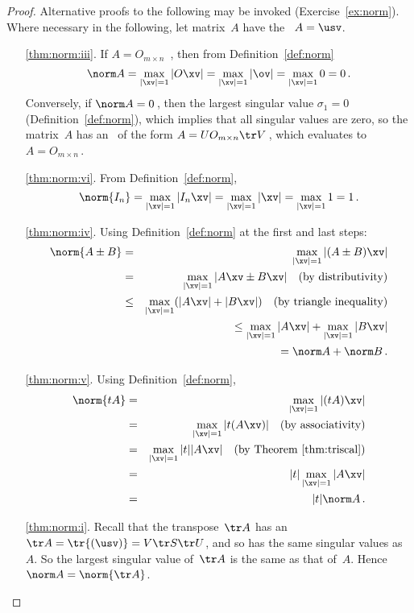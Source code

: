 \begin{proof}  Alternative proofs to the following may be invoked (Exercise~\ref{ex:norm}).
Where necessary in the following, let matrix~\(A\) have the \svd\ \(A=\usv\).
\begin{itemize}
\item[\ref{thm:norm:iii}.]
If \(A=O_{m\times n}\) \,,
then from Definition~\ref{def:norm} 
\begin{equation*}
\norm A=\max_{|\xv|=1}|O\xv|
=\max_{|\xv|=1}|\ov|=\max_{|\xv|=1}0=0\,.
\end{equation*}
Conversely, if \(\norm A=0\)\,, then the largest singular value \(\sigma_1=0\) (Definition~\ref{def:norm}), which implies that all singular values are zero, so the matrix~\(A\) has an \svd\ of the form \(A=UO_{m\times n}\tr V\)\,, which evaluates to \(A=O_{m\times n}\)\,.

\item[\ref{thm:norm:vi}.] From Definition~\ref{def:norm}, 
\begin{equation*}
\norm{I_n}=\max_{|\xv|=1}|I_n\xv|
=\max_{|\xv|=1}|\xv|
=\max_{|\xv|=1}1
=1\,.
\end{equation*}


\item[\ref{thm:norm:iv}.]
Using Definition~\ref{def:norm} at the first and last steps:
\begin{eqnarray*}
\norm{A\pm B}
&=&\max_{|\xv|=1}|(A\pm B)\xv|
\\&=&\max_{|\xv|=1}|A\xv\pm B\xv|
\quad(\text{by distributivity})
\\&\leq&\max_{|\xv|=1}(|A\xv|+ |B\xv|)
\quad(\text{by triangle inequality})
\\&&{}\leq\max_{|\xv|=1}|A\xv|+ \max_{|\xv|=1}|B\xv|
\\&&{}\phantom{\leq}=\norm A+ \norm B\,.
\end{eqnarray*}

\item[\ref{thm:norm:v}.]
Using Definition~\ref{def:norm},
\begin{eqnarray*}
\norm{tA}
&=&\max_{|\xv|=1}|(tA)\xv|
\\&=&\max_{|\xv|=1}|t(A\xv)|
\quad(\text{by associativity})
\\&=&\max_{|\xv|=1}|t||A\xv|
\quad(\text{by Theorem~\ref{thm:triscal}})
\\&=&|t|\max_{|\xv|=1}|A\xv|
\\&=&|t|\norm A\,.
\end{eqnarray*}

\item[\ref{thm:norm:i}.]
Recall that the transpose~\(\tr A\) has an \svd\ \(\tr A=\tr{(\usv)}=V\tr S\tr U\), and so has the same singular values as~\(A\).
So the largest singular value of~\(\tr A\) is the same as that of~\(A\).
Hence \(\norm A=\norm{\tr A}\).


\end{itemize}
\end{proof}

